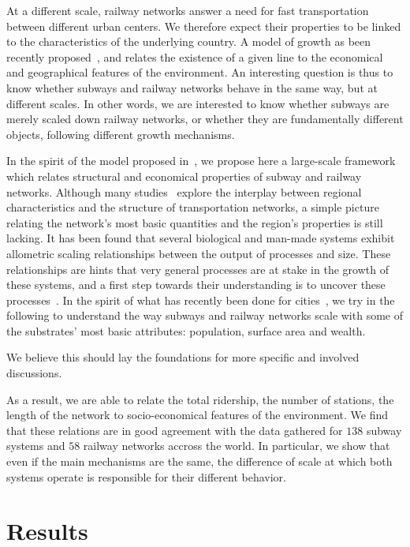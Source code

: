 At a different scale, railway networks answer a need for fast transportation
between different urban centers. We therefore expect their properties to be
linked to the characteristics of the underlying country. A model of growth as
been recently proposed~\cite{Louf:2013}, and relates the existence of a given
line to the economical and geographical features of the environment. An
interesting question is thus to know whether subways and railway networks behave
in the same way, but at different scales. In other words, we are interested to
know whether subways are merely scaled down railway networks, or whether they
are fundamentally different objects, following different growth mechanisms. 

In the spirit of the model proposed in~\cite{Louf:2013}, we propose here a
large-scale framework which relates structural and economical properties of
subway and railway networks. Although many
studies~\cite{Kansky:1963,Derrible:2009,Levinson:2012} explore the interplay
between regional characteristics and the structure of transportation networks, a
simple picture relating the network's most basic quantities and the region's
properties is still lacking. It has been found that several biological and
man-made systems exhibit allometric scaling relationships between the output of
processes and size. These relationships are hints that very general processes
are at stake in the growth of these systems, and a first step towards their
understanding is to uncover these processes~\cite{Banavar:1999,Louf:2014}. In
the spirit of what has recently been done for cities~\cite{Louf:2014}, we try in
the following to understand the way subways and railway networks scale with some
of the substrates' most basic attributes: population, surface area and wealth. 

We believe this should lay the foundations for more specific and involved discussions.

As a result, we are able to relate the total ridership, the number of stations,
the length of the network to socio-economical features of the environment. We
find that these relations are in good agreement with the data gathered for $138$
subway systems and $58$ railway networks accross the world. In particular, we
show that even if the main mechanisms are the same, the difference of scale at
which both systems operate is responsible for their different behavior. 


\section*{Results}

